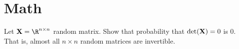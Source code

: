 \section{Math}

\begin{problembox}{}{}
Let $\bX = \R^{n \times n}$ random matrix. Show that probability that $\det(\mathbf{X}) = 0$ is $0$. That is, almost all $n \times n$ random matrices are invertible. 
\end{problembox}
